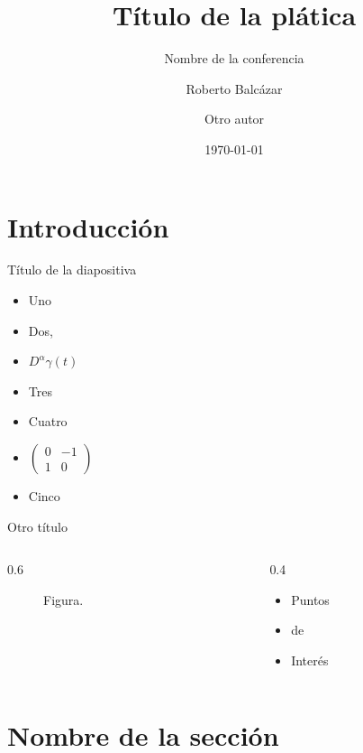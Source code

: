 \documentclass{UADYbeamer}
\title{Título de la plática}
\subtitle{Nombre de la conferencia}
\author[Roberto Balcázar]{Roberto Balcázar \and Otro autor}
\date{\today} %
\institute[Universidad Autónoma de Yucatán]{Facultad de Matemáticas}
\begin{document}
\maketitle

\cutoc

\section{Introducción}

\begin{frame}{Título de la diapositiva}
    \begin{itemize}
        \item Uno
        \item Dos,
        \item $D^{\alpha}\gamma(t)$
        \item Tres
        \item Cuatro
        \item $\begin{pmatrix}
            0&-1\\1&0
        \end{pmatrix}$
        \item Cinco
    \end{itemize}
\end{frame}

\begin{frame}{Otro título}
    \begin{columns}
        \begin{column}{0.6\textwidth}
            \begin{figure}
                \centering
                
                \caption{Figura.}
            \end{figure}
        \end{column}
        \begin{column}{0.4\textwidth}
            \begin{itemize}
                \item Puntos
                \item de
                \item Interés
            \end{itemize}
        \end{column}
    \end{columns}
\end{frame}

\section{Nombre de la sección}
\end{document}
